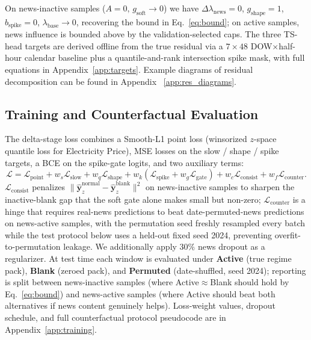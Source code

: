 \documentclass{article}
\begin{document}
On news-inactive samples ($A{=}0,\,g_{\text{soft}}{\to}0$) we have $\Delta\lambda_{\text{news}}{=}0$, $g_{\text{shape}}{=}1$, $b_{\text{spike}}{=}0$, $\lambda_{\text{base}}{\to}0$, recovering the bound in Eq.~\ref{eq:bound}; on active samples, news influence is bounded above by the validation-selected caps.
The three TS-head targets are derived offline from the true residual via a $7{\times}48$ DOW$\times$half-hour calendar baseline plus a quantile-and-rank intersection spike mask, with full equations in Appendix~\ref{app:targets}. Example diagrams of residual decomposition can be found in Appendix ~\ref{app:res_diagrams}.





\subsection{Training and Counterfactual Evaluation}
\label{sec:training-cf}

The delta-stage loss combines a Smooth-L1 point loss (winsorized $z$-space quantile loss for Electricity Price), MSE losses on the slow / shape / spike targets, a BCE on the spike-gate logits, and two auxiliary terms:
\begin{equation}
    \mathcal{L} = \mathcal{L}_{\text{point}} + w_s\mathcal{L}_{\text{slow}} + w_q\mathcal{L}_{\text{shape}} + w_k(\mathcal{L}_{\text{spike}}+w_g\mathcal{L}_{\text{gate}}) + w_c\mathcal{L}_{\text{consist}} + w_f\mathcal{L}_{\text{counter}}.
    \label{eq:loss}
\end{equation}
$\mathcal{L}_{\text{consist}}$ penalizes $\|\hat{\bm{y}}^{\text{normal}}_z-\hat{\bm{y}}^{\text{blank}}_z\|^2$ on news-inactive samples to sharpen the inactive-blank gap that the soft gate alone makes small but non-zero;
$\mathcal{L}_{\text{counter}}$ is a hinge that requires real-news predictions to beat date-permuted-news predictions on news-active samples, with the permutation seed freshly resampled every batch while the test protocol below uses a held-out fixed seed 2024, preventing overfit-to-permutation leakage.
We additionally apply $30\%$ news dropout as a regularizer.
At test time each window is evaluated under \textbf{Active} (true regime pack), \textbf{Blank} (zeroed pack), and \textbf{Permuted} (date-shuffled, seed 2024); reporting is split between news-inactive samples (where Active${\approx}$Blank should hold by Eq.~\ref{eq:bound}) and news-active samples (where Active should beat both alternatives if news content genuinely helps).
Loss-weight values, dropout schedule, and full counterfactual protocol pseudocode are in Appendix~\ref{app:training}.
\end{document}
